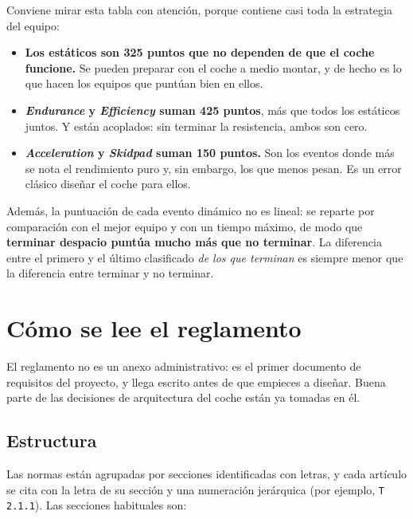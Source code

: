 Conviene mirar esta tabla con atención, porque contiene casi toda la estrategia
del equipo:

\begin{itemize}
  \item \textbf{Los estáticos son 325 puntos que no dependen de que el coche
        funcione.} Se pueden preparar con el coche a medio montar, y de hecho es
        lo que hacen los equipos que puntúan bien en ellos.
  \item \textbf{\textit{Endurance} y \textit{Efficiency} suman 425 puntos}, más
        que todos los estáticos juntos. Y están acoplados: sin terminar la
        resistencia, ambos son cero.
  \item \textbf{\textit{Acceleration} y \textit{Skidpad} suman 150 puntos.} Son
        los eventos donde más se nota el rendimiento puro y, sin embargo, los que
        menos pesan. Es un error clásico diseñar el coche para ellos.
\end{itemize}

Además, la puntuación de cada evento dinámico no es lineal: se reparte por
comparación con el mejor equipo y con un tiempo máximo, de modo que
\textbf{terminar despacio puntúa mucho más que no terminar}. La diferencia entre
el primero y el último clasificado \emph{de los que terminan} es siempre menor
que la diferencia entre terminar y no terminar.

\section{Cómo se lee el reglamento}
\label{sec:formula_student:03}

El reglamento no es un anexo administrativo: es el primer documento de
requisitos del proyecto, y llega escrito antes de que empieces a diseñar. Buena
parte de las decisiones de arquitectura del coche están ya tomadas en él.

\subsection{Estructura}

Las normas están agrupadas por secciones identificadas con letras, y cada
artículo se cita con la letra de su sección y una numeración jerárquica (por
ejemplo, \texttt{T 2.1.1}). Las secciones habituales son:

